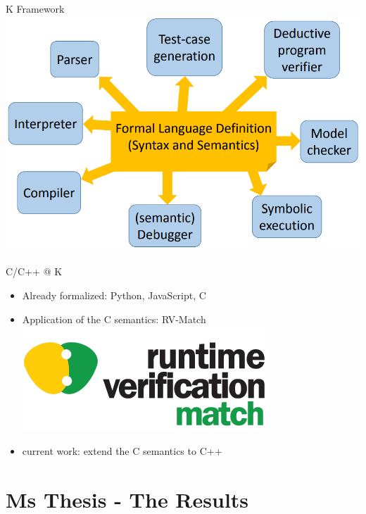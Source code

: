 \documentclass[11pt]{beamer}
\begin{document}
\begin{frame}{K Framework}
\includegraphics[width=1.0\linewidth]{img/kidea.png}
\end{frame}

\begin{frame}{C/C++ @ K}
\begin{itemize}
\item Already formalized: Python, JavaScript, C
\pause \item Application of the C semantics: RV-Match \\
\includegraphics[width=0.3\linewidth]{img/rvmatch.png}
\pause \item current work: extend the C semantics to C++
\end{itemize}
\end{frame}

\section{Ms Thesis - The Results}


\end{document}
